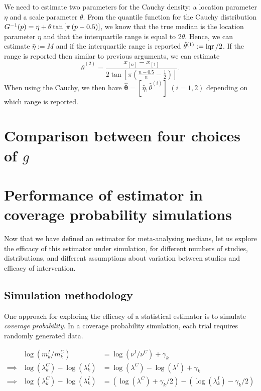 \documentclass{article}
\begin{document}
\noindent We need to estimate two parameters for the Cauchy density: a location parameter $\eta$ and a scale parameter $\theta$. From the quantile function for the Cauchy distribution $G^{-1}(p) = \eta + \theta\tan\left[\pi \left(p - 0.5 \right)\right]$, we know that the true median is the location parameter $\eta$ and that the interquartile range is equal to $2\theta$. Hence, we can estimate $\hat\eta := M$ and if the interquartile range is reported $\hat{\theta}^{(1)} := \operatorname{iqr}/ 2$.  If the range is reported then similar to previous arguments, we can estimate $$\hat{\theta}^{(2)} = \frac{x_{[n]} - x_{[1]}}{2\tan\left[\pi\left(\frac{n-0.5}{n}-\frac{1}{2}\right)\right]}.$$
When using the Cauchy, we then have $\hat{\bm{\theta}}=[\hat \eta, \hat{\theta}^{(i)}]$ $(i=1,2)$ depending on which range is reported.

\section{Comparison between four choices of $g$}


\section{Performance of estimator in coverage probability simulations}

Now that we have defined an estimator for meta-analysing medians, let us explore the efficacy of this estimator under simulation, for different numbers of studies, distributions, and different assumptions about variation between studies and efficacy of intervention.

\subsection{Simulation methodology}

One approach for exploring the efficacy of a statistical estimator is to simulate \emph{coverage probability}. In a coverage probability simulation, each trial requires randomly generated data.


\begin{alignat*}
\, & \log(m_k^I/m_k^C) & = \log(\nu^I/\nu^C) + \gamma_k\\
\implies & \log(\lambda_k^C) - \log(\lambda_k^I) & = \log(\lambda^C) - \log(\lambda^I) + \gamma_k\\
\implies & \log(\lambda_k^C) - \log(\lambda_k^I) & = (\log(\lambda^C) + \gamma_k/2) - (\log(\lambda_k^I) - \gamma_k/2)
\end{alignat*}
\end{document}
